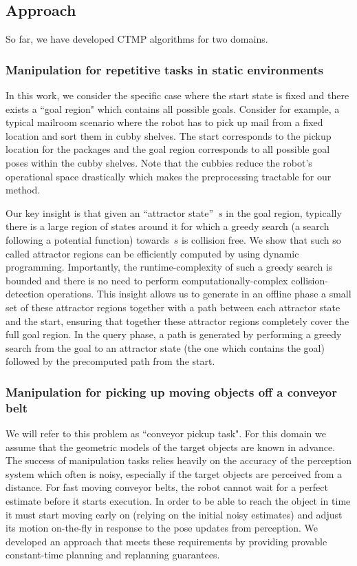 \documentclass[a4paper,10pt]{article}
\begin{document}
\subsection{Approach}
So far, we have developed CTMP algorithms for two domains.
\subsubsection{Manipulation for repetitive tasks in static environments}
In this work, we consider the specific case where the start state is fixed and there exists a ``goal region" which contains all possible goals. Consider for example, a typical mailroom scenario where the robot has to pick up mail from a fixed location and sort them in cubby shelves. The start corresponds to the pickup location for the packages and the goal region corresponds to all possible goal poses within the cubby shelves. Note that the cubbies reduce the robot's operational space drastically which makes the preprocessing tractable for our method.

Our key insight is that given an ``attractor state''~$s$ in the goal region, typically there is a large region of states around it for which a greedy search (a search following a potential function) towards~$s$ is collision free. We show that such so called attractor regions can be efficiently computed by using dynamic programming.
Importantly, the runtime-complexity of such a greedy search is bounded and there is no need to perform computationally-complex collision-detection operations. 
This insight allows us to generate in an offline phase a small set of these attractor regions together with a path between each attractor state and the start, ensuring that together these attractor regions completely cover the full goal region.
In the query phase, a path is generated by performing a greedy search from the goal to an attractor state (the one which contains the goal) followed by the precomputed path from the start.

\subsubsection{Manipulation for picking up moving objects off a conveyor belt}
We will refer to this problem as ``conveyor pickup task". For this domain we assume that the geometric models of the target objects are known in advance. The success of manipulation tasks relies heavily on the accuracy of the perception system which often is noisy, especially if the target objects are perceived from a distance. For fast moving conveyor belts, the robot cannot wait for a perfect estimate before it starts execution. In order to be able to reach the object in time it must start moving early on (relying on the initial noisy estimates) and adjust its motion on-the-fly in response to the pose updates from perception. We developed an approach that meets these requirements by providing provable constant-time planning and replanning guarantees.
\end{document}
